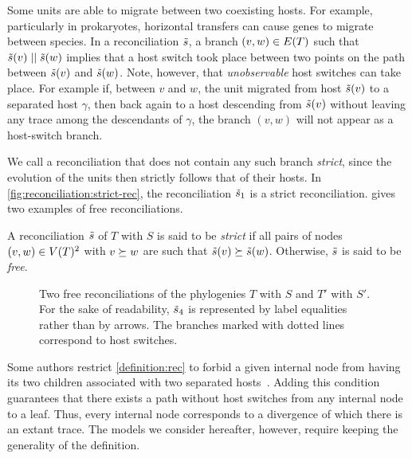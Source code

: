 Some units are able to migrate between two coexisting hosts.
For example, particularly in prokaryotes, horizontal transfers can cause genes to migrate between species.
In a reconciliation \(\tilde{s}\), a branch \((v, w) \in E(T)\) such that \(\tilde{s}(v) \mathrel{||} \tilde{s}(w)\) implies that a host switch took place between two points on the path between \(\tilde{s}(v)\) and \(\tilde{s}(w)\).
Note, however, that \emph{unobservable} host switches can take place.
For example if, between \(v\) and \(w\), the unit migrated from host \(\tilde{s}(v)\) to a separated host \(\gamma\), then back again to a host descending from \(\tilde{s}(v)\) without leaving any trace among the descendants of \(\gamma\), the branch \((v, w)\) will not appear as a host-switch branch.

We call a reconciliation that does not contain any such branch \emph{strict}, since the evolution of the units then strictly follows that of their hosts.
In \cref{fig:reconciliation:strict-rec}, the reconciliation \(\tilde{s}_1\) is a strict reconciliation.
 gives two examples of free reconciliations.

\begin{definition}\label{definition:rec-strict}
    A reconciliation \(\tilde{s}\) of \(T\) with \(S\) is said to be \emph{strict} if all pairs of nodes
    \((v, w) \in V(T)^2\) with \(v \succeq w\) are such that \(\tilde{s}(v) \succeq \tilde{s}(w)\).
    Otherwise, \(\tilde{s}\) is said to be \emph{free}.
\end{definition}

\begin{figure}[htb]
    \capstart
    \centering
    
    \caption[Two examples of free reconciliations]{
        Two free reconciliations of the phylogenies \(T\) with \(S\) and \(T'\) with \(S'\).
        For the sake of readability, \(\tilde{s}_4\) is represented by label equalities rather than by arrows.
        The branches marked with dotted lines correspond to host switches.
    }
    \label{fig:reconciliation:free-rec}
\end{figure}

Some authors restrict \cref{definition:rec} to forbid a given internal node from having its two children associated with two separated hosts~\parencite{Nojgaard2018TimeConsistentReconciliation}.
Adding this condition guarantees that there exists a path without host switches from any internal node to a leaf.
Thus, every internal node corresponds to a divergence of which there is an extant trace.
The models we consider hereafter, however, require keeping the generality of the definition.

